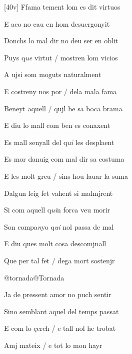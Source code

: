 \documentclass[12pt]{article}
\begin{document}
\begin{estrofa}

 [40v] Ffama tement lom es dit virtuos

 E aco no cau en hom desuergonyit

 Donchs lo mal dir no deu ser en oblit

 Puys q\textit{ue} virtut / mostren lom vicios

 A ujsi som moguts naturalment

 E costreny nos por / dela mala fama

 Beneyt aquell / qujl be sa boca brama

 E diu lo mall com ben es conaxent

\end{estrofa}



\begin{estrofa}

 Es mall senyall del q\textit{ui} les desplaent

 Es mor danuig com mal dir sa costuma

 E les molt greu / sins hou lauar la suma

 Dalgun leig fet vahent si malmjrent

 Si com aquell q\textit{ui}n forca veu morir

 Son compa\textit{n}yo q\textit{ui} nol passa de mal

 E diu ques molt cosa descomjnall

 Que per tal fet / dega mort sostenjr

\end{estrofa}


\begin{estrofaExtra}%




@tornada@Tornada


\end{estrofaExtra}


\begin{estrofa}

 Ja de pressent amor no puch sentir

 Sino semblant aquel del temps passat

 E com lo \c{c}erch / e tall nol he trobat

 Amj mateix / e tot lo mon hayr

\end{estrofa}
\end{document}
